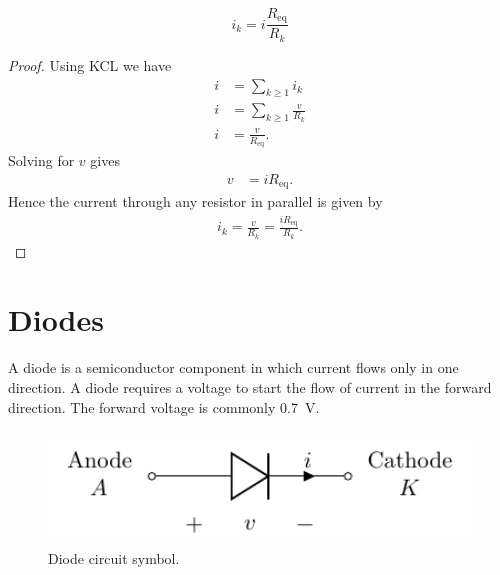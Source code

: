 \documentclass{article}
\begin{document}
\begin{theorem}
    \begin{equation*}
        i_k = i \frac{R_{\mathrm{eq}}}{R_k}
    \end{equation*}
\end{theorem}
\begin{proof}
    Using KCL we have
    \begin{align*}
        i & = \sum_{k\geq1} i_k           \\
        i & = \sum_{k\geq1} \frac{v}{R_k} \\
        i & = \frac{v}{R_{\mathrm{eq}}}.
    \end{align*}
    Solving for \(v\) gives
    \begin{align*}
        v & = i R_{\mathrm{eq}}.
    \end{align*}
    Hence the current through any resistor in parallel is given by
    \begin{align*}
        i_k = \frac{v}{R_k} = \frac{iR_{\mathrm{eq}}}{R_k}.
    \end{align*}
\end{proof}
\newpage
\section{Diodes}
\begin{definition}[Diode]
    A diode is a semiconductor component in which current flows only in one direction. A diode requires a voltage to start the flow of current in the forward direction.
    The forward voltage is commonly \qty{0.7}{V}.
\end{definition}
\begin{figure}[H]
    \centering
    \includegraphics[height = 3cm, keepaspectratio = true]{figures/diode.pdf}
    \caption{Diode circuit symbol.}
\end{figure}
\end{document}
